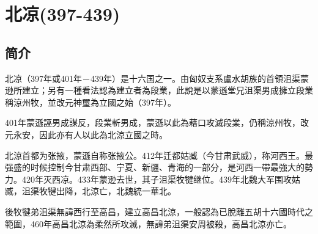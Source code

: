 

\section{北凉\tiny(397-439)}

\subsection{简介}

北凉（397年或401年－439年）是十六国之一。由匈奴支系盧水胡族的首領沮渠蒙逊所建立；另有一種看法認為建立者為段業，此說是以蒙遜堂兄沮渠男成擁立段業稱涼州牧，並改元神璽為立國之始（397年）。

401年蒙遜誣男成謀反，段業斬男成，蒙遜以此為藉口攻滅段業，仍稱涼州牧，改元永安，因此亦有人以此為北涼立國之時。

北涼首都为张掖，蒙遜自称张掖公。412年迁都姑臧（今甘肃武威），称河西王。最强盛的时候控制今甘肃西部、宁夏、新疆、青海的一部分，是河西一帶最強大的勢力。420年灭西凉。433年蒙逊去世，其子沮渠牧犍继位。439年北魏大军围攻姑臧，沮渠牧犍出降，北涼亡，北魏統一華北。

後牧犍弟沮渠無諱西行至高昌，建立高昌北涼，一般認為已脫離五胡十六國時代之範圍，460年高昌北涼為柔然所攻滅，無諱弟沮渠安周被殺，高昌北涼亦亡。






